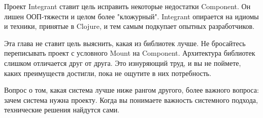 Проект Integrant ставит цель исправить некоторые недостатки Component. Он лишен
ООП-тяжести и целом более "кложурный". Integrant опирается на идиомы и техники,
принятые в Clojure, и тем самым подкупает опытных разработчиков.

Эта глава не ставит цель выяснить, какая из библиотек лучше. Не бросайтесь
переписывать проект с условного Mount на Component. Архитектура библиотек
слишком отличается друг от друга. Это изнуряющий труд, и вы не поймете, каких
преимуществ достигли, пока не ощутите в них потребность.

Вопрос о том, какая система лучше ниже рангом другого, более важного вопроса:
зачем система нужна проекту. Когда вы понимаете важность системного подхода,
технические решения найдутся сами.
